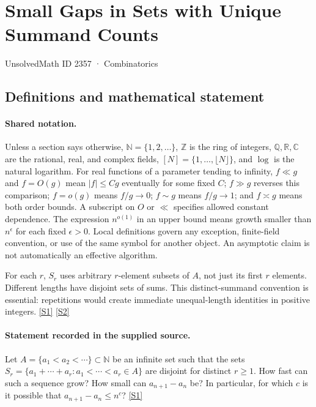 \documentclass[11pt,a4paper]{article}
\newcommand{\N}{\mathbb{N}}
\newcommand{\Z}{\mathbb{Z}}
\newcommand{\Q}{\mathbb{Q}}
\newcommand{\R}{\mathbb{R}}
\newcommand{\C}{\mathbb{C}}
\newcommand{\sref}[2]{\hyperlink{source:#1:#2}{[S#2]}}
\begin{document}

\setcounter{section}{2356}

\section{Small Gaps in Sets with Unique Summand Counts}\label{2357}

{\small\sffamily UnsolvedMath ID 2357 · Combinatorics}

\subsection{Definitions and mathematical statement}

\paragraph{Shared notation.}Unless a section says otherwise, $\N=\{1,2,\ldots\}$,
$\Z$ is the ring of integers, $\Q,\R,\C$ are the rational, real, and complex
fields, $[N]=\{1,\ldots,\lfloor N\rfloor\}$, and $\log$ is the natural
logarithm. For real functions of a parameter tending to infinity,
$f\ll g$ and $f=O(g)$ mean $|f|\leq Cg$ eventually for some fixed $C$;
$f\gg g$ reverses this comparison; $f=o(g)$ means $f/g\to0$;
$f\sim g$ means $f/g\to1$; and $f\asymp g$ means both order bounds.
A subscript on $O$ or $\ll$ specifies allowed constant dependence.
The expression $n^{o(1)}$ in an upper bound means growth smaller than
$n^\epsilon$ for each fixed $\epsilon>0$. Local definitions govern any
exception, finite-field convention, or use of the same symbol for another
object. An asymptotic claim is not automatically an effective algorithm.



For each $r$, $S_r$ uses arbitrary $r$-element subsets of $A$, not just its first $r$ elements. Different lengths have disjoint sets of sums. This distinct-summand convention is essential: repetitions would create immediate unequal-length identities in positive integers. \sref{2357}{1} \sref{2357}{2}

\paragraph{Statement recorded in the supplied source.}
Let $A=\{a_1<a_2<\cdots\}\subset \mathbb{N}$ be an infinite set such that the sets $ S_r = \{ a_1+\cdots +a_r : a_1<\cdots<a_r\in A\} $ are disjoint for distinct $r\geq 1$. How fast can such a sequence grow? How small can $a_{n+1}-a_n$ be? In particular, for which $c$ is it possible that $a_{n+1}-a_n\leq n^{c}$? \sref{2357}{1}
\end{document}

